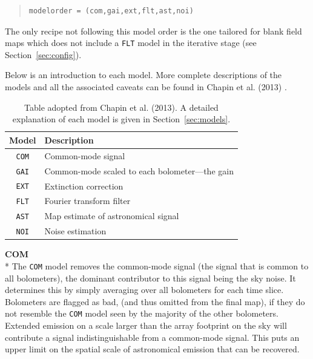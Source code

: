 \documentclass[twoside,11pt]{article}
\newcommand{\htmlref}[2]{#1}
\newcommand{\latexhtml}[2]{#1}
\renewcommand{\_}{\texttt{\symbol{95}}}
\newcommand{\model}[1]{\texttt{#1}}
\newcommand{\cref}[3]{\latexhtml{#1~\ref{#2}}{\htmlref{#3}{#2}}}
\begin{document}
\begin{quote}
\begin{verbatim}
modelorder = (com,gai,ext,flt,ast,noi)
\end{verbatim}
\end{quote}

The only recipe not following this model order is the one tailored for
blank field maps which does not include a \model{FLT} model in the
iterative stage (see \cref{Section}{sec:config}{Specialised
configuration files}).

Below is an introduction to each model. More complete descriptions of the
models and all the associated caveats can be found in Chapin et al.
(2013) \cite{mapmaker}.
\begin{htmlonly}
\setlength{\extrarowheight}{3pt}
\begin{table}[t!]
\centering
\begin{tabular}{c|l}
\hline
\textbf{Model} &\hspace{0.2cm} \textbf{Description} \\
\hline
\model{COM}&\hspace{0.2cm} Common-mode signal\\
\model{GAI}&\hspace{0.2cm} Common-mode scaled to each bolometer---the gain\\
\model{EXT}&\hspace{0.2cm} Extinction correction\\
\model{FLT}&\hspace{0.2cm} Fourier transform filter\\
\model{AST}&\hspace{0.2cm} Map estimate of astronomical signal\\
\model{NOI}&\hspace{0.2cm} Noise estimation\\
\hline
\end{tabular}
\label{tab:mods}
\caption{\small Table adopted from Chapin et al. (2013). A detailed
explanation of each model is given in \cref{Section}{sec:models}{The individual models}.}
\end{table}


\textbf{COM}\\*
The \model{COM} model removes the
common-mode signal (the signal that is common to all bolometers), the
dominant contributor to this signal being the sky noise. It determines
this by simply averaging over all bolometers for each time slice.
Bolometers are flagged as bad, (and thus omitted from the final map), if
they do not resemble the \model{COM} model seen by the majority of the
other bolometers.
\newline Extended emission on a scale larger than the array footprint
on the sky will contribute a signal indistinguishable from a
common-mode signal. This puts an upper limit on the spatial scale of
astronomical emission that can be recovered. \\


\end{htmlonly}
\end{document}

